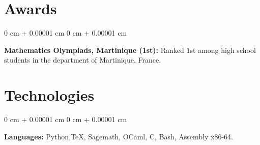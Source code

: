 \documentclass[10pt, letterpaper]{article}
\newenvironment{onecolentry}{
    \begin{adjustwidth}{
        0 cm + 0.00001 cm
    }{
        0 cm + 0.00001 cm
    }
}{
    \end{adjustwidth}
} %
\begin{document}
        \vspace{0.2 cm}

    \section{Awards}
        
        \begin{onecolentry}
            \textbf{Mathematics Olympiads, Martinique (1st):} Ranked $1$st among high school students in the department of Martinique, France.
        \end{onecolentry}
    
    \section{Technologies}
        
        \begin{onecolentry}
            \textbf{Languages:} Python,\TeX, Sagemath, OCaml, C, Bash, Assembly x86-64.
        \end{onecolentry}
    
\end{document}
